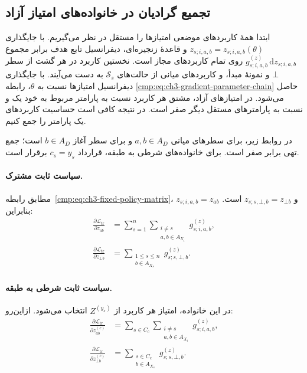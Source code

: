 \subsection{تجمیع گرادیان در خانواده‌های امتیاز آزاد}
\label{app:ch3-gradient-free-score-families}

ابتدا همهٔ کاربردهای موضعی امتیازها را
مستقل در نظر می‌گیریم. با جایگذاری
$z_{s;i,a,b}=z_{s;i,a,b}(\theta)$ و
قاعدهٔ زنجیره‌ای، دیفرانسیل تابع هدف
برابر مجموع
$g_{s;i,a,b}^{(z)}\,\mathrm dz_{s;i,a,b}$
روی تمام کاربردهای مجاز است. نخستین
کاربرد در هر گشت از سطر $\bot$ و
نمونهٔ مبدأ، و کاربردهای میانی از حالت‌های
$\mathcal S_s$ به دست می‌آیند. با
جایگذاری دیفرانسیل امتیازها نسبت به
$\theta$، رابطه
\eqref{cmp:eq:ch3-gradient-parameter-chain}
حاصل می‌شود. در امتیازهای آزاد، مشتق
هر کاربرد نسبت به پارامتر مربوط به خود
یک و نسبت به پارامترهای مستقل دیگر صفر
است. در نتیجه کافی است حساسیت کاربردهای
یک پارامتر را جمع کنیم.

در روابط زیر، برای سطرهای میانی
$a,b\in A_D$ و برای سطر آغاز $b\in A_D$
است؛ جمع تهی برابر صفر است. برای
خانواده‌های شرطی به طبقه، قرارداد
$c_s=y_s$ برقرار است.

\paragraph{سیاست ثابت مشترک.}
مطابق رابطه~\eqref{cmp:eq:ch3-fixed-policy-matrix}،
$z_{s;i,a,b}=z_{ab}$ و
$z_{s;s,\bot,b}=z_{\bot b}$ است. بنابراین:
\begin{equation}\label{eq:app-ch3-gradient-shared-scores}
\begin{aligned}
\frac{\partial\mathcal L_{\mathrm{tr}}}{\partial z_{ab}}
&=\sum_{s=1}^n
\sum_{\substack{i\ne s\\a,b\in A_{X_i}}}
g_{s;i,a,b}^{(z)},\\
\frac{\partial\mathcal L_{\mathrm{tr}}}{\partial z_{\bot b}}
&=\sum_{\substack{1\le s\le n\\b\in A_{X_s}}}
g_{s;s,\bot,b}^{(z)}.
\end{aligned}
\end{equation}

\paragraph{سیاست ثابت شرطی به طبقه.}
در این خانواده، امتیاز هر کاربرد از
$Z^{(y_s)}$ انتخاب می‌شود. ازاین‌رو:
\begin{equation}\label{eq:app-ch3-gradient-class-scores}
\begin{aligned}
\frac{\partial\mathcal L_{\mathrm{tr}}}{\partial z^{(c)}_{ab}}
&=\sum_{s\in C_c}
\sum_{\substack{i\ne s\\a,b\in A_{X_i}}}
g_{s;i,a,b}^{(z)},\\
\frac{\partial\mathcal L_{\mathrm{tr}}}{\partial z^{(c)}_{\bot b}}
&=\sum_{\substack{s\in C_c\\b\in A_{X_s}}}
g_{s;s,\bot,b}^{(z)}.
\end{aligned}
\end{equation}

